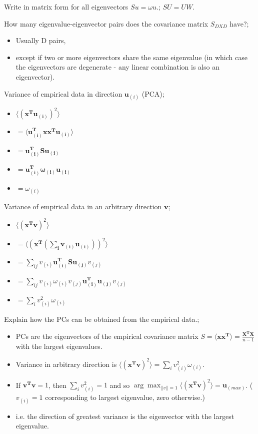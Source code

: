 \documentclass{article}
\begin{document}
Write in matrix form for all eigenvectors $Su = \omega u$.; $SU=UW$.

How many eigenvalue-eigenvector pairs does the covariance matrix $S_{DXD}$ have?; \begin{itemize} \item Usually D pairs, \item except if two or more eigenvectors share the same eigenvalue (in which case the eigenvectors are degenerate - any linear combination is also an eigenvector).  \end{itemize}

Variance of empirical data in direction $\mathbf{u}_{(i)}$ (PCA); \begin{itemize} \item $\langle (\mathbf{x^Tu_{(i)}})^2\rangle $ \item $= \langle \mathbf{u_{(i)}^Txx^Tu_{(i)}}\rangle $ \item $=\mathbf{u_{(i)}^TSu_{(i)}}$ \item $=\mathbf{u_{(i)}^T\omega_{(i)}u_{(i)}}$ \item $=\omega_{(i)}$ \end{itemize}

Variance of empirical data in an arbitrary direction $\mathbf{v}$; \begin{itemize} \item $\langle (\mathbf{x^Tv})^2\rangle $ \item $= \langle (\mathbf{x^T(\sum_i v_{(i)}\mathbf{u}_{(i)})})^2\rangle $ \item $=\sum_{ij}v_{(i)}\mathbf{u_{(i)}^TSu_{(j)}}v_{(j)}$ \item $=\sum_{ij}v_{(i)}\omega_{(i)}v_{(j)}\mathbf{u_{(i)}^Tu_{(j)}}v_{(j)}$ \item $=\sum_i v_{(i)}^2\omega_{(i)}$ \end{itemize}

Explain how the PCs can be obtained from the empirical data.; \begin{itemize} \item PCs are the eigenvectors of the empirical covariance matrix $S=\langle\mathbf{xx^T}\rangle=\frac{\mathbf{X^TX}}{n-1}$ with the largest eigenvalues.  \item Variance in arbitrary direction is $\langle (\mathbf{x^Tv})^2\rangle =\sum_i v_{(i)}^2\omega_{(i)}$.  \item If $\mathbf{v^Tv}=1$, then $\sum_i v_{(i)}^2=1$ and so $\arg\max_{||v||=1} \langle (\mathbf{x^Tv})^2\rangle = \mathbf{u}_{(max)}$. ($v_{(i)}=1$ corresponding to largest eigenvalue, zero otherwise.) \item i.e. the direction of greatest variance is the eigenvector with the largest eigenvalue.  \end{itemize}
\end{document}
